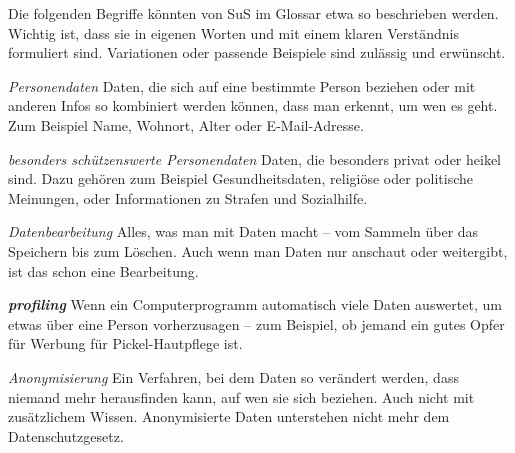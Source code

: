 \begin{aufgabe}{5}

Die folgenden Begriffe könnten von SuS im Glossar etwa so beschrieben werden. Wichtig ist, dass sie in eigenen Worten und mit einem klaren Verständnis formuliert sind. Variationen oder passende Beispiele sind zulässig und erwünscht.

\textit{Personendaten}  
Daten, die sich auf eine bestimmte Person beziehen oder mit anderen Infos so kombiniert werden können, dass man erkennt, um wen es geht. Zum Beispiel Name, Wohnort, Alter oder E-Mail-Adresse.

\textit{besonders schützenswerte Personendaten}  
Daten, die besonders privat oder heikel sind. Dazu gehören zum Beispiel Gesundheitsdaten, religiöse oder politische Meinungen, oder Informationen zu Strafen und Sozialhilfe.

\textit{Datenbearbeitung}  
Alles, was man mit Daten macht – vom Sammeln über das Speichern bis zum Löschen. Auch wenn man Daten nur anschaut oder weitergibt, ist das schon eine Bearbeitung.

\textbf{\textit{profiling}}  
Wenn ein Computerprogramm automatisch viele Daten auswertet, um etwas über eine Person vorherzusagen – zum Beispiel, ob jemand ein gutes Opfer für Werbung für Pickel-Hautpflege ist.

\textit{Anonymisierung}  
Ein Verfahren, bei dem Daten so verändert werden, dass niemand mehr herausfinden kann, auf wen sie sich beziehen. Auch nicht mit zusätzlichem Wissen. Anonymisierte Daten unterstehen nicht mehr dem Datenschutzgesetz.

\end{aufgabe}




